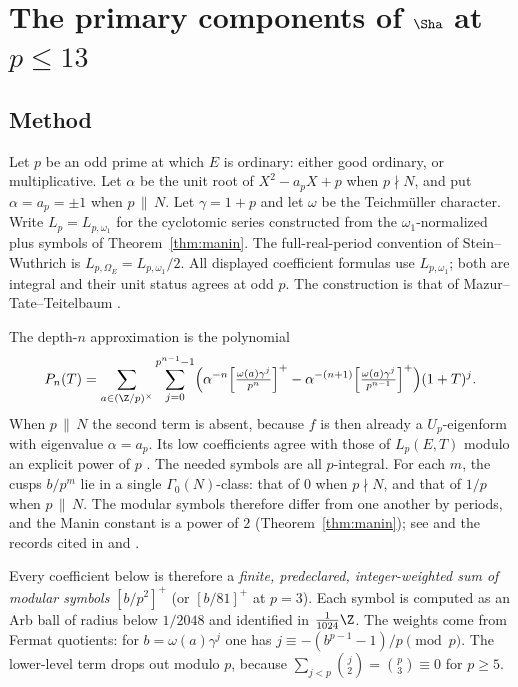 \section[Primary components at primes up to 13]{The primary components of $\Sha$ at $p\le13$}\label{sec:primary}

\subsection{Method}\label{subsec:method}
Let $p$ be an odd prime at which $E$ is ordinary: either good ordinary, or multiplicative. Let $\alpha$ be the unit root of $X^2-a_pX+p$ when $p\nmid N$, and put $\alpha=a_p=\pm1$ when $p\,\|\,N$. Let $\gamma=1+p$ and let $\omega$ be the Teichm\"uller character. Write $L_p=L_{p,\omega_1}$ for the cyclotomic series constructed from the $\omega_1$-normalized plus symbols of Theorem~\ref{thm:manin}. The full-real-period convention of Stein--Wuthrich \cite{sw} is $L_{p,\Omega_E}=L_{p,\omega_1}/2$. All displayed coefficient formulas use $L_{p,\omega_1}$; both are integral and their unit status agrees at odd $p$. The construction is that of Mazur--Tate--Teitelbaum \cite{mtt}.

The depth-$n$ approximation is the polynomial
\[
P_n(T)=\sum_{a\in(\Z/p)^\times}\sum_{j=0}^{p^{n-1}-1}\Bigl(\alpha^{-n}\Bigl[\tfrac{\omega(a)\gamma^j}{p^n}\Bigr]^+-\alpha^{-(n+1)}\Bigl[\tfrac{\omega(a)\gamma^j}{p^{n-1}}\Bigr]^+\Bigr)(1+T)^j .
\]
When $p\,\|\,N$ the second term is absent, because $f$ is then already a $U_p$-eigenform with eigenvalue $\alpha=a_p$. Its low coefficients agree with those of $L_p(E,T)$ modulo an explicit power of $p$ \cite[Prop.~3.5]{sw}. The needed symbols are all $p$-integral. For each $m$, the cusps $b/p^m$ lie in a single $\Gamma_0(N)$-class: that of $0$ when $p\nmid N$, and that of $1/p$ when $p\,\|\,N$. The modular symbols therefore differ from one another by periods, and the Manin constant is a power of $2$ (Theorem~\ref{thm:manin}); see \cite[\S3]{sw} and the records cited in  and .

Every coefficient below is therefore a \emph{finite, predeclared, integer-weighted sum of modular symbols} $[b/p^2]^+$ (or $[b/81]^+$ at $p=3$). Each symbol is computed as an Arb ball of radius below $1/2048$ and identified in $\frac1{1024}\Z$. The weights come from Fermat quotients: for $b=\omega(a)\gamma^j$ one has $j\equiv-(b^{p-1}-1)/p\pmod p$. The lower-level term drops out modulo $p$, because $\sum_{j<p}\binom j2=\binom p3\equiv0$ for $p\ge5$.

